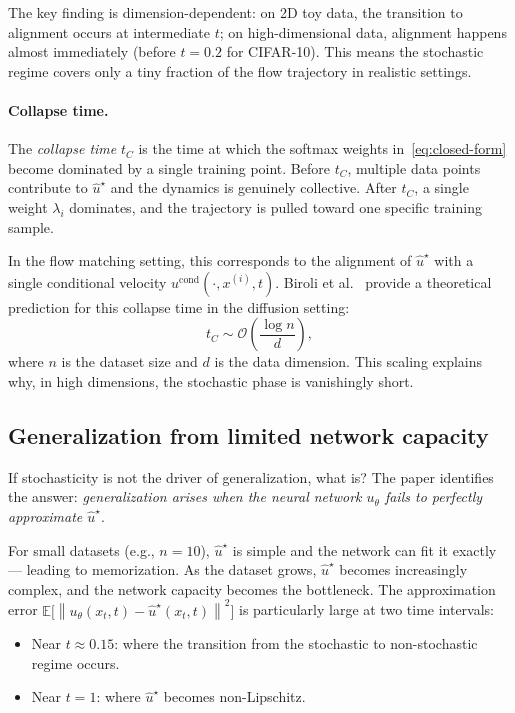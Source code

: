 \documentclass[10pt,a4paper]{article}
\theoremstyle{definition}
\newcommand{\E}{\mathbb{E}}
\newcommand{\norm}[1]{\left\lVert #1 \right\rVert}
\begin{document}
The key finding is dimension-dependent: on 2D toy data, the transition to alignment occurs at intermediate $t$; on high-dimensional data, alignment happens almost immediately (before $t = 0.2$ for CIFAR-10).
This means the stochastic regime covers only a tiny fraction of the flow trajectory in realistic settings.

\paragraph{Collapse time.}
The \emph{collapse time} $t_C$ is the time at which the softmax weights in~\eqref{eq:closed-form} become dominated by a single training point.
Before $t_C$, multiple data points contribute to $\hat{u}^\star$ and the dynamics is genuinely collective.
After $t_C$, a single weight $\lambda_i$ dominates, and the trajectory is pulled toward one specific training sample.

In the flow matching setting, this corresponds to the alignment of $\hat{u}^\star$ with a single conditional velocity $u^{\mathrm{cond}}(\cdot, x^{(i)}, t)$.
Biroli et al.~\cite{biroli2024dynamical} provide a theoretical prediction for this collapse time in the diffusion setting:
\begin{equation}\label{eq:collapse-biroli}
    t_C \sim \mathcal{O}\!\left(\frac{\log n}{d}\right),
\end{equation}
where $n$ is the dataset size and $d$ is the data dimension.
This scaling explains why, in high dimensions, the stochastic phase is vanishingly short.

\subsection{Generalization from limited network capacity}\label{subsec:capacity}

If stochasticity is not the driver of generalization, what is?
The paper identifies the answer: \emph{generalization arises when the neural network $u_\theta$ fails to perfectly approximate $\hat{u}^\star$}.

For small datasets (e.g., $n=10$), $\hat{u}^\star$ is simple and the network can fit it exactly --- leading to memorization.
As the dataset grows, $\hat{u}^\star$ becomes increasingly complex, and the network capacity becomes the bottleneck.
The approximation error $\E\!\big[\norm{u_\theta(x_t, t) - \hat{u}^\star(x_t, t)}^2\big]$ is particularly large at two time intervals:
\begin{itemize}[nosep,leftmargin=1.5em]
    \item Near $t \approx 0.15$: where the transition from the stochastic to non-stochastic regime occurs.
    \item Near $t = 1$: where $\hat{u}^\star$ becomes non-Lipschitz.
\end{itemize}
\end{document}
